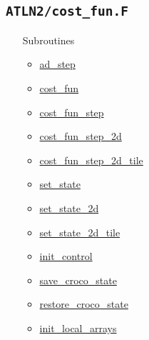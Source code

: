 \message{ !name(croco.tex)}\documentclass{article}
\begin{document}
\subsection{\texttt{ATLN2/cost\_fun.F}}
\begin{itemize}
\item[Subroutines]
  \begin{itemize}
  \item \hyperref[adstep]{ad\_step}
  \item \hyperref[costfun]{cost\_fun}
  \item \hyperref[costfunstep]{cost\_fun\_step}
  \item \hyperref[costfunstep]{cost\_fun\_step\_2d}
  \item \hyperref[costfunstep]{cost\_fun\_step\_2d\_tile}
  \item \hyperref[setstate]{set\_state}
  \item \hyperref[setstate]{set\_state\_2d}
  \item \hyperref[setstate]{set\_state\_2d\_tile}
  \item \hyperref[initcontrol]{init\_control}
  \item \hyperref[savecrocostate]{save\_croco\_state}
  \item \hyperref[restorecrocostate]{restore\_croco\_state}
  \item \hyperref[initlocalarrays]{init\_local\_arrays}
  \end{itemize}
\end{itemize}
\end{document}
